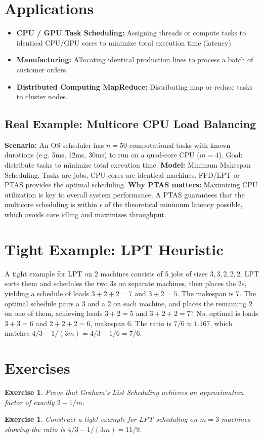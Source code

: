 \documentclass[11pt,oneside]{book}
\newtheorem{exercise}[theorem]{Exercise}
\begin{document}
\section{Applications}
\begin{itemize}
    \item \textbf{CPU / GPU Task Scheduling:} Assigning threads or compute tasks to identical CPU/GPU cores to minimize total execution time (latency).
    \item \textbf{Manufacturing:} Allocating identical production lines to process a batch of customer orders.
    \item \textbf{Distributed Computing MapReduce:} Distributing map or reduce tasks to cluster nodes.
\end{itemize}

\subsection*{Real Example: Multicore CPU Load Balancing}
\textbf{Scenario:} An OS scheduler has $n=50$ computational tasks with known durations (e.g. 5ms, 12ms, 30ms) to run on a quad-core CPU ($m=4$). Goal: distribute tasks to minimize total execution time.
\textbf{Model:} Minimum Makespan Scheduling. Tasks are jobs, CPU cores are identical machines. FFD/LPT or PTAS provides the optimal scheduling.
\textbf{Why PTAS matters:} Maximizing CPU utilization is key to overall system performance. A PTAS guarantees that the multicore scheduling is within $\epsilon$ of the theoretical minimum latency possible, which avoids core idling and maximizes throughput.

\section{Tight Example: LPT Heuristic}
A tight example for LPT on 2 machines consists of 5 jobs of sizes $3, 3, 2, 2, 2$. LPT sorts them and schedules the two 3s on separate machines, then places the 2s, yielding a schedule of loads $3+2+2 = 7$ and $3+2 = 5$. The makespan is 7. The optimal schedule pairs a 3 and a 2 on each machine, and places the remaining 2 on one of them, achieving loads $3+2 = 5$ and $3+2+2 = 7$? No, optimal is loads $3+3 = 6$ and $2+2+2 = 6$, makespan 6. The ratio is $7/6 \approx 1.167$, which matches $4/3 - 1/(3m) = 4/3 - 1/6 = 7/6$.

\section{Exercises}
\begin{exercise}
Prove that Graham's List Scheduling achieves an approximation factor of exactly $2 - 1/m$.
\end{exercise}
\begin{exercise}
Construct a tight example for LPT scheduling on $m=3$ machines showing the ratio is $4/3 - 1/(3m) = 11/9$.
\end{exercise}
\end{document}
